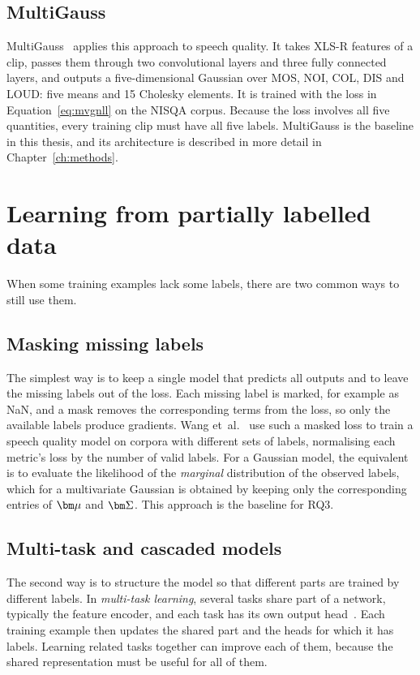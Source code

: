 \documentclass[
english,                 %
bibtex,                  %
includeExtraAbstracts, %
]{kththesis}
\numberwithin{listing}{chapter}
\begin{document}
\subsection{MultiGauss}
\label{sec:multigaussBackground}

MultiGauss~\cite{cumlin_multigauss_2025} applies this approach to speech quality. It takes XLS-R features of a clip, passes them through two convolutional layers and three fully connected layers, and outputs a five-dimensional Gaussian over MOS, NOI, COL, DIS and LOUD: five means and 15 Cholesky elements. It is trained with the loss in Equation~\eqref{eq:mvgnll} on the NISQA corpus. Because the loss involves all five quantities, every training clip must have all five labels. MultiGauss is the baseline in this thesis, and its architecture is described in more detail in Chapter~\ref{ch:methods}.

\section{Learning from partially labelled data}
\label{sec:partialLabels}

When some training examples lack some labels, there are two common ways to still use them.

\subsection{Masking missing labels}

The simplest way is to keep a single model that predicts all outputs and to leave the missing labels out of the loss. Each missing label is marked, for example as \gls{NaN}, and a mask removes the corresponding terms from the loss, so only the available labels produce gradients. Wang et~al.~\cite{wang_urgentmos_2026} use such a masked loss to train a speech quality model on corpora with different sets of labels, normalising each metric's loss by the number of valid labels. For a Gaussian model, the equivalent is to evaluate the likelihood of the \emph{marginal} distribution of the observed labels, which for a multivariate Gaussian is obtained by keeping only the corresponding entries of $\vect{\mu}$ and $\vect{\Sigma}$. This approach is the baseline for RQ3.

\subsection{Multi-task and cascaded models}

The second way is to structure the model so that different parts are trained by different labels. In \emph{multi-task learning}, several tasks share part of a network, typically the feature encoder, and each task has its own output head~\cite{caruana_multitask_1997}. Each training example then updates the shared part and the heads for which it has labels. Learning related tasks together can improve each of them, because the shared representation must be useful for all of them.
\end{document}
